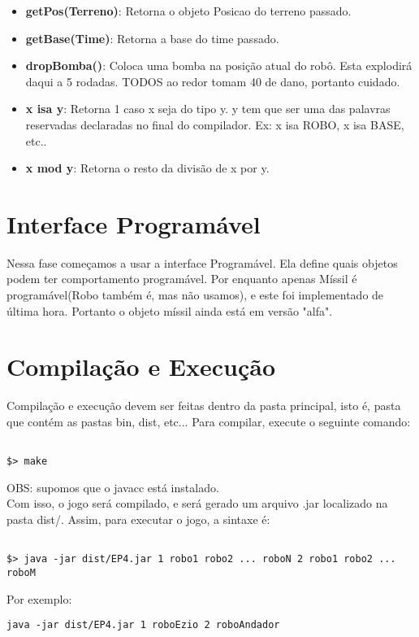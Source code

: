 \documentclass[11pt]{article}
\begin{document}
\begin{itemize}
    \item \textbf{getPos(Terreno)}: Retorna o objeto Posicao do terreno passado.
    
    \item \textbf{getBase(Time)}: Retorna a base do time passado.
    
    \item \textbf{dropBomba()}: Coloca uma bomba na posição atual do robô. Esta explodirá daqui a 5 rodadas. TODOS ao redor tomam 40 de dano, portanto cuidado.
    
    \item \textbf{x isa y}: Retorna 1 caso x seja do tipo y. y tem que ser uma das palavras reservadas declaradas no final do compilador. Ex: x isa ROBO, x isa BASE, etc..
    
    \item \textbf{x mod y}: Retorna o resto da divisão de x por y.
\end{itemize}


\section{Interface Programável}

Nessa fase começamos a usar a interface Programável. Ela define quais objetos podem ter comportamento programável. Por enquanto apenas Míssil é programável(Robo também é, mas não usamos), e este foi implementado de última hora. Portanto o objeto míssil ainda está em versão "alfa".


\section{Compilação e Execução}

Compilação e execução devem ser feitas dentro da pasta principal, isto é, pasta que contém as pastas bin, dist, etc...
Para compilar, execute o seguinte comando:


\begin{verbatim}

$> make

\end{verbatim}
OBS: supomos que o javacc está instalado.
\\Com isso, o jogo será compilado, e será gerado um arquivo .jar localizado na pasta dist/. Assim, para executar o jogo, a sintaxe é:

\begin{verbatim}

$> java -jar dist/EP4.jar 1 robo1 robo2 ... roboN 2 robo1 robo2 ... roboM

\end{verbatim}

Por exemplo: 

\begin{verbatim}
java -jar dist/EP4.jar 1 roboEzio 2 roboAndador
\end{verbatim}
\end{document}
